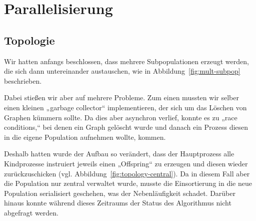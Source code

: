 \chapter{Parallelisierung}
\label{chp:para}

\section{Topologie}
\label{sec:topo}

Wir hatten anfangs beschlossen, dass mehrere Subpopulationen erzeugt
werden, die sich dann untereinander austauschen, wie in
Abbildung~\ref{fig:mult-subpop} beschrieben.

\begin{SCfigure}
  \centering
  \caption[Mehrere Subpopulationen]{\label{fig:mult-subpop}Es werden mehrere Subpopulationen
    erzeugt, die dem jeweils nächsten Prozess dann Teile aus der
    eigenen Population zusenden.}
\end{SCfigure}

Dabei stießen wir aber auf mehrere Probleme.  Zum einen mussten wir
selber einen kleinen „garbage collector“ implementieren, der sich um
das Löschen von Graphen kümmern sollte.  Da dies aber asynchron
verlief, konnte es zu „race conditions,“ bei denen ein Graph gelöscht
wurde und danach ein Prozess diesen in die eigene Population aufnehmen
wollte, kommen.

Deshalb hatten wurde der Aufbau so verändert, dass der Hauptprozess
alle Kindprozesse instruiert jeweils einen „Offspring“ zu erzeugen und
diesen wieder zurückzuschicken
(vgl. Abbildung~\ref{fig:topology-central}).  Da in diesem Fall aber
die Population nur zentral verwaltet wurde, musste die Einsortierung
in die neue Population serialisiert %
geschehen, was der Nebenläufigkeit schadet.  Darüber hinaus konnte
während dieses Zeitraums der Status des Algorithmus nicht abgefragt
werden.

